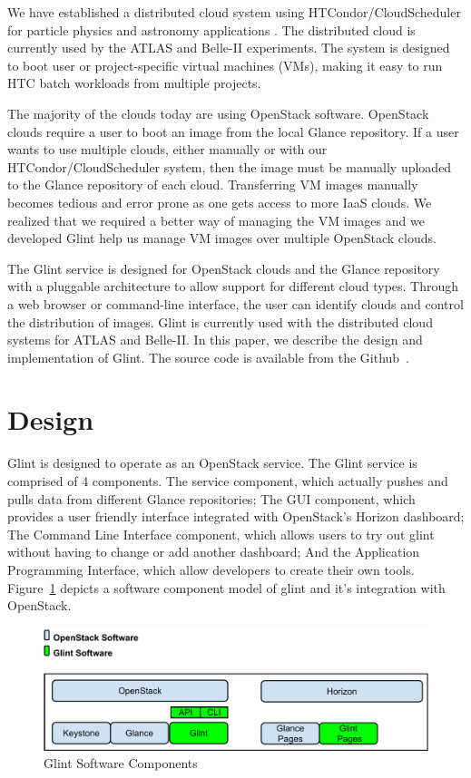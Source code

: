 \documentclass[a4paper]{jpconf}
\begin{document}
We have established a distributed cloud system using HTCondor/CloudScheduler for particle physics and astronomy applications \cite{hpcs:cloudpaper, sobie-nyc-cloud}. The distributed cloud is currently used by the ATLAS \cite{ryan-chep} and Belle-II \cite{sobie-chep} experiments. The system is designed to boot user or project-specific virtual machines (VMs), making it easy to run HTC batch workloads from multiple projects.

The majority of the clouds today are using OpenStack software. OpenStack clouds require a user to boot an image from the local Glance repository. If a user wants to use multiple clouds, either manually or with our HTCondor/CloudScheduler system, then the image must be manually uploaded to the Glance repository of each cloud. Transferring VM images manually becomes tedious and error prone as one gets access to more IaaS clouds. We realized that we required a better way of managing the VM images and we developed Glint help us manage VM images over multiple OpenStack clouds.

The Glint service is designed for OpenStack clouds and the Glance repository with a pluggable architecture to allow support for different cloud types. Through a web browser or command-line interface, the user can identify clouds and control the distribution of images. Glint is currently used with the distributed cloud systems for ATLAS and Belle-II. In this paper, we describe the design and implementation of Glint. The source code is available from the Github~\cite{glint}.

\section{Design}
Glint is designed to operate as an OpenStack service. The Glint service is comprised of 4 components. The service component, which actually pushes and pulls data from different Glance repositories; The GUI component, which provides a user friendly interface integrated with OpenStack's Horizon dashboard; The Command Line Interface component, which allows users to try out glint without having to change or add another dashboard; And the Application Programming Interface, which allow developers to create their own tools. Figure~\ref{fig:glintfigure} depicts a software component model of glint and it's integration with OpenStack. 

\begin{figure}[ht]
\begin{center}
\includegraphics[width=36pc]{images/glintdesign.pdf}
\caption{\label{fig:glintfigure}Glint Software Components}
\end{center}
\end{figure}
\end{document}
